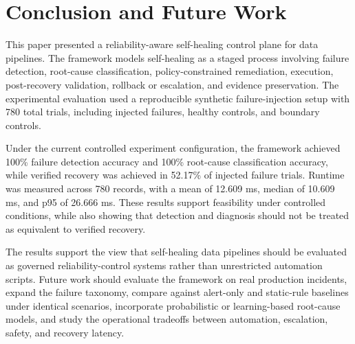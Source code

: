\section{Conclusion and Future Work}

This paper presented a reliability-aware self-healing control plane for data pipelines. The framework models self-healing as a staged process involving failure detection, root-cause classification, policy-constrained remediation, execution, post-recovery validation, rollback or escalation, and evidence preservation. The experimental evaluation used a reproducible synthetic failure-injection setup with 780 total trials, including injected failures, healthy controls, and boundary controls.

Under the current controlled experiment configuration, the framework achieved 100\% failure detection accuracy and 100\% root-cause classification accuracy, while verified recovery was achieved in 52.17\% of injected failure trials. Runtime was measured across 780 records, with a mean of 12.609 ms, median of 10.609 ms, and p95 of 26.666 ms. These results support feasibility under controlled conditions, while also showing that detection and diagnosis should not be treated as equivalent to verified recovery.

The results support the view that self-healing data pipelines should be evaluated as governed reliability-control systems rather than unrestricted automation scripts. Future work should evaluate the framework on real production incidents, expand the failure taxonomy, compare against alert-only and static-rule baselines under identical scenarios, incorporate probabilistic or learning-based root-cause models, and study the operational tradeoffs between automation, escalation, safety, and recovery latency.
